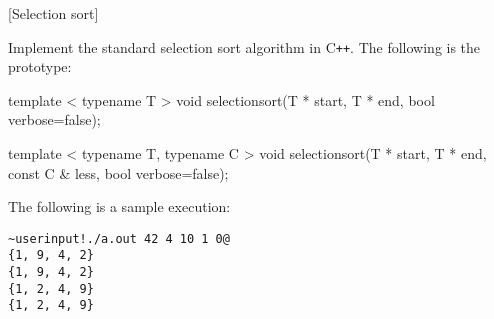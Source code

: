 [Selection sort]

Implement the standard selection sort algorithm in C\texttt{++}.
The following is the prototype:
\begin{console}[frame=single, fontsize=\footnotesize]
template < typename T >
void selectionsort(T * start, T * end, bool verbose=false);

template < typename T, typename C >
void selectionsort(T * start, T * end, const C & less, bool verbose=false);
\end{console}

The following is a sample execution:
\begin{Verbatim}[frame=single,commandchars=\~\!\@,fontsize=\footnotesize]
~userinput!./a.out 42 4 10 1 0@
{1, 9, 4, 2}
{1, 9, 4, 2}
{1, 2, 4, 9}
{1, 2, 4, 9}
\end{Verbatim}


